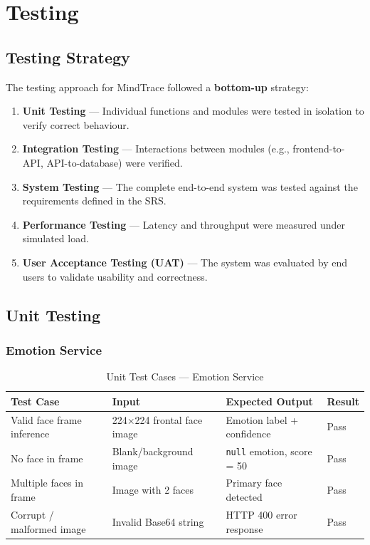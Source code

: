 \chapter{Testing}


\section{Testing Strategy}

The testing approach for MindTrace followed a \textbf{bottom-up} strategy:

\begin{enumerate}
    \item \textbf{Unit Testing} — Individual functions and modules were
          tested in isolation to verify correct behaviour.
    \item \textbf{Integration Testing} — Interactions between modules
          (e.g., frontend-to-API, API-to-database) were verified.
    \item \textbf{System Testing} — The complete end-to-end system was
          tested against the requirements defined in the SRS.
    \item \textbf{Performance Testing} — Latency and throughput were
          measured under simulated load.
    \item \textbf{User Acceptance Testing (UAT)} — The system was
          evaluated by end users to validate usability and correctness.
\end{enumerate}

\section{Unit Testing}

\subsection{Emotion Service}

\begin{table}[H]
\centering
\caption{Unit Test Cases — Emotion Service}
\begin{tabular}{p{} p{} p{} l}
\toprule
\textbf{Test Case}          & \textbf{Input}             & \textbf{Expected Output}    & \textbf{Result} \\
\midrule
Valid face frame inference  & 224×224 frontal face image & Emotion label + confidence  & Pass \\
No face in frame            & Blank/background image     & \texttt{null} emotion, score = 50 & Pass \\
Multiple faces in frame     & Image with 2 faces         & Primary face detected       & Pass \\
Corrupt / malformed image   & Invalid Base64 string      & HTTP 400 error response     & Pass \\
\bottomrule
\end{tabular}
\end{table}

